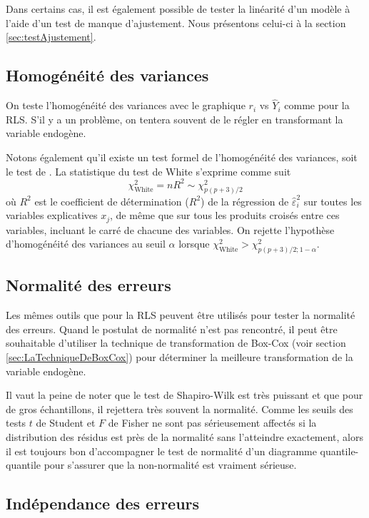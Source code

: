 \vspace{0.05 in}
Dans certains cas, il est également possible de tester la linéarité d'un modèle à l'aide d'un test de manque d'ajustement. Nous présentons celui-ci à la section \ref{sec:testAjustement}.

\newpage

\subsection{Homogénéité des variances}

On teste l'homogénéité des variances avec le graphique $r_i$ vs $\hat{Y}_i$ comme pour la RLS. S'il y a un problème, on tentera souvent de le régler en transformant la variable endogène.

Notons également qu'il existe un test formel de l'homogénéité des variances, soit le test de \citet{Whi:1980}. La statistique du test de White s'exprime comme suit
$$\chi^2_{\text{White}} = nR^2 \sim \chi^2_{p(p+3)/2}$$
o\`u $R^2$ est le coefficient de détermination ($R^2$) de la régression de $\hat\varepsilon_i^2$ sur toutes les variables explicatives $x_j$, de m\^eme que sur tous les produits croisés entre ces variables, incluant le carré de chacune des variables. On rejette l'hypothèse d'homogénéité des variances au seuil
$\alpha$ lorsque $\chi^2_{\text{White}}>\chi^2_{p(p+3)/2;1-\alpha}$.

\subsection{Normalité des erreurs}

Les mêmes outils que pour la RLS peuvent être utilisés pour tester la normalité des erreurs. Quand le postulat de normalité n'est pas rencontré, il peut \^etre souhaitable  d'utiliser la technique de transformation de Box-Cox (voir section \ref{sec:LaTechniqueDeBoxCox}) pour déterminer la meilleure transformation de la variable endogène.

Il vaut la peine de noter que le test de Shapiro-Wilk est très puissant et que
pour de gros échantillons, il rejettera très souvent la
normalité. Comme les seuils des tests $t$ de Student et $F$ de Fisher ne sont pas
sérieusement affectés si la distribution des résidus est
près de la normalité sans l'atteindre exactement, alors il est
toujours bon d'accompagner le test de normalité d'un diagramme quantile-quantile pour s'assurer que la non-normalité est vraiment sérieuse.

\subsection{Indépendance des erreurs}

